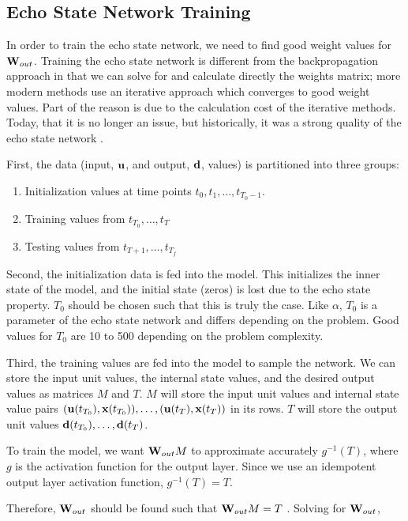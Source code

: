 \documentclass{article}
\begin{document}
\subsection{Echo State Network Training}
\label{sec:etrain}

In order to train the echo state network, we need to find good 
weight values for $\mathbf{W}_{out}$. Training the echo state network is different
from the backpropagation approach in that we can solve for
and calculate directly the weights matrix; more modern methods use
an iterative approach which converges to good weight values. Part of the
reason is due to the calculation cost of the iterative methods. Today, that
it is no longer an issue, but historically, it was a strong quality of
the echo state network \cite{jaeger2007echo}.

First, the data (input, $\mathbf{u}$, and output, $\mathbf{d}$, values) is partitioned into three groups:
\begin{enumerate}
    \item Initialization values at time points
    $t_0, t_1, \dots, t_{T_0-1}$.
    \item Training values from
    $t_{T_0}, \dots, t_T$
    \item Testing values from
    $t_{T+1}, \dots, t_{T_f}$
\end{enumerate}

Second, the initialization data is fed into the model. This initializes the
inner state of the model, and the initial state (zeros) is lost due to the 
echo state property. $T_0$ should be chosen such that this is truly the 
case. Like $\alpha$, $T_0$ is a parameter of the echo state network and
differs depending on the problem. Good values for $T_0$ are 10 to 500 
depending on the problem complexity.

Third, the training values are fed into the model to sample the network.
We can store the input unit values, the internal state values, and the 
desired output values as matrices $M$ and $T$. $M$ will store the input 
unit values and internal state value pairs
$(\mathbf{u}(t_{T_0}), \mathbf{x}(t_{T_0})), \dots, (\mathbf{u}(t_T), \mathbf{x}(t_T))$
in its rows. $T$ will store the output unit values
$\mathbf{d}(t_{T_0}), \dots, \mathbf{d}(t_T)$.

To train the model, we want $\mathbf{W}_{out} M$ to approximate accurately
$g^{-1}(T)$, where $g$ is the activation function for the output layer.
Since we use an idempotent output layer activation function,
$g^{-1}(T) = T$.

Therefore, $\mathbf{W}_{out}$ should be found such that $\mathbf{W}_{out} M = T$ 
\cite{jaeger2002tutorial}.
Solving for $\mathbf{W}_{out}$,
\end{document}
